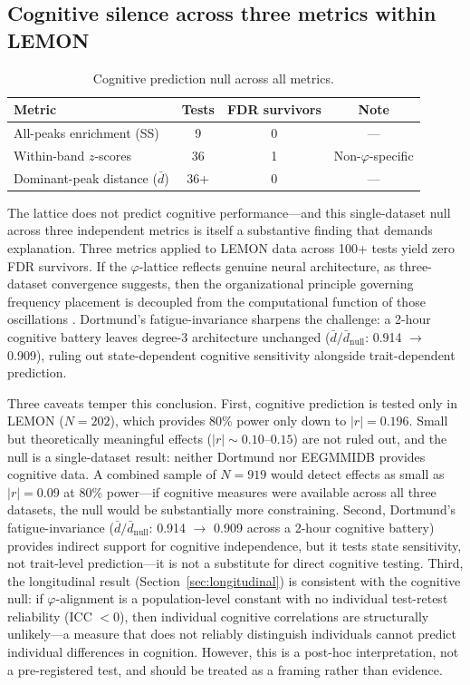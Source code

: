 \documentclass[11pt,a4paper]{article}
\newcommand{\phisym}{\varphi}
\begin{document}
\subsection{Cognitive silence across three metrics within LEMON}

\begin{table}[H]
\centering
\caption{Cognitive prediction null across all metrics.}
\begin{tabular}{lccc}
\toprule
Metric & Tests & FDR survivors & Note \\
\midrule
All-peaks enrichment (SS) & 9 & 0 & --- \\
Within-band $z$-scores & 36 & 1 & Non-$\phisym$-specific \\
Dominant-peak distance ($\bar{d}$) & 36+ & 0 & --- \\
\bottomrule
\end{tabular}
\end{table}

The lattice does not predict cognitive performance---and this single-dataset null across three independent metrics is itself a substantive finding that demands explanation. Three metrics applied to LEMON data across 100+ tests yield zero FDR survivors. If the $\phisym$-lattice reflects genuine neural architecture, as three-dataset convergence suggests, then the organizational principle governing frequency placement is decoupled from the computational function of those oscillations \parencite{Siegel2012}. Dortmund's fatigue-invariance sharpens the challenge: a 2-hour cognitive battery leaves degree-3 architecture unchanged ($\bar{d}/\bar{d}_{\text{null}}$: 0.914 $\to$ 0.909), ruling out state-dependent cognitive sensitivity alongside trait-dependent prediction.

Three caveats temper this conclusion. First, cognitive prediction is tested only in LEMON ($N = 202$), which provides 80\% power only down to $|r| = 0.196$. Small but theoretically meaningful effects ($|r| \sim 0.10$--$0.15$) are not ruled out, and the null is a single-dataset result: neither Dortmund nor EEGMMIDB provides cognitive data. A combined sample of $N = 919$ would detect effects as small as $|r| = 0.09$ at 80\% power---if cognitive measures were available across all three datasets, the null would be substantially more constraining. Second, Dortmund's fatigue-invariance ($\bar{d}/\bar{d}_{\text{null}}$: 0.914 $\to$ 0.909 across a 2-hour cognitive battery) provides indirect support for cognitive independence, but it tests state sensitivity, not trait-level prediction---it is not a substitute for direct cognitive testing. Third, the longitudinal result (Section~\ref{sec:longitudinal}) is consistent with the cognitive null: if $\phisym$-alignment is a population-level constant with no individual test-retest reliability (ICC $< 0$), then individual cognitive correlations are structurally unlikely---a measure that does not reliably distinguish individuals cannot predict individual differences in cognition. However, this is a post-hoc interpretation, not a pre-registered test, and should be treated as a framing rather than evidence.
\end{document}
